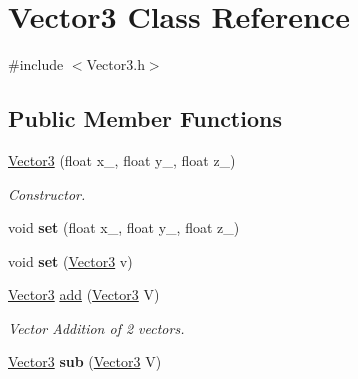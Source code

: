 \hypertarget{class_vector3}{\section{Vector3 Class Reference}
\label{class_vector3}
}


{\ttfamily \#include $<$Vector3.\+h$>$}

\subsection*{Public Member Functions}
\begin{DoxyCompactItemize}
\item 
\hyperlink{class_vector3_ad843eb49e7d4fce292ca66bbd835cfe5}{Vector3} (float x\+\_\+, float y\+\_\+, float z\+\_\+)
\begin{DoxyCompactList}\small\item\em Constructor. \end{DoxyCompactList}\item 
\hypertarget{class_vector3_a350a53f275853752ebb968f1dd14370a}{void {\bfseries set} (float x\+\_\+, float y\+\_\+, float z\+\_\+)}\label{class_vector3_a350a53f275853752ebb968f1dd14370a}

\item 
\hypertarget{class_vector3_a3de55a74b495779d2049d4c25770e72d}{void {\bfseries set} (\hyperlink{class_vector3}{Vector3} v)}\label{class_vector3_a3de55a74b495779d2049d4c25770e72d}

\item 
\hyperlink{class_vector3}{Vector3} \hyperlink{class_vector3_a75071ea9be5f22de4d3b6fed7c348d7c}{add} (\hyperlink{class_vector3}{Vector3} V)
\begin{DoxyCompactList}\small\item\em Vector Addition of 2 vectors. \end{DoxyCompactList}\item 
\hypertarget{class_vector3_a59f675ff225d75a745ae9bc711ffbdfa}{\hyperlink{class_vector3}{Vector3} {\bfseries sub} (\hyperlink{class_vector3}{Vector3} V)}\label{class_vector3_a59f675ff225d75a745ae9bc711ffbdfa}


\end{DoxyCompactItemize}

